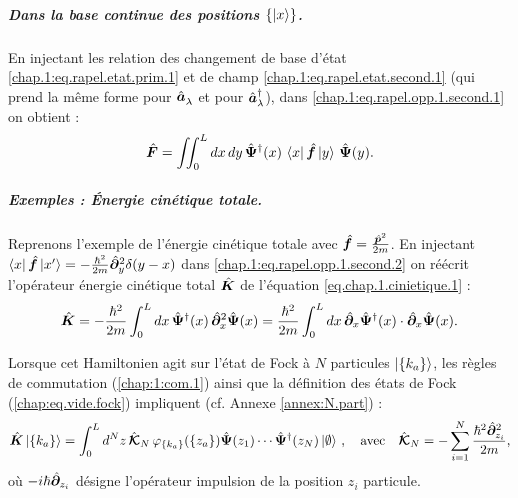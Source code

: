 \subparagraph{Dans la base continue des positions \( \{ \ket{x} \} \).}
En injectant les relation des changement de base d'état
\eqref{chap.1:eq.rapel.etat.prim.1} et de champ \eqref{chap.1:eq.rapel.etat.second.1} (qui prend la même forme pour $\hat{\bm{a}}_\lambda^{}$ et pour $\hat{\bm{a}}_\lambda^\dagger$), dans \eqref{chap.1:eq.rapel.opp.1.second.1} on obtient :
\begin{eqnarray}\label{chap.1:eq.rapel.opp.1.second.2}
\hat{\bm{F}} = \iint_0^L dx \, dy \, \hat{\bm{\Psi}}^\dagger(x) \, \bra{ x} \hat{\bm{f}} \ket{y} \, \hat{\bm{\Psi}}(y).
\end{eqnarray}%
\begin{mdframed}[
	linewidth=0.5pt, 
	backgroundcolor=gray!5, 
	roundcorner=50pt,	
	innerleftmargin=5pt,
    innerrightmargin=5pt,
    innertopmargin=-10pt,
    innerbottommargin=2pt,
    leftmargin=2pt,
    rightmargin=2pt
]
\subparagraph{Exemples : Énergie cinétique totale.}
Reprenons l'exemple de l'énergie cinétique totale avec  $\hat{\bm{f}} = \frac{\hat{\bm{p}}^2}{2m}$. En injectant $\bra{x} \hat{\bm{f}} \ket{x'} = - \frac{\hbar^2}{2m} \hat{\bm{\partial}}_{y}^2 \delta ( y - x )$ dans \eqref{chap.1:eq.rapel.opp.1.second.2} on réécrit l'opérateur énergie cinétique total $\hat{\bm{K}}$ de l'équation \eqref{eq.chap.1.cinietique.1} :
\begin{eqnarray}
\hat{\bm{K}} =  -\frac{\hbar^2}{2m} \int_0^L dx \, \hat{\bm{\Psi}}^\dagger(x) \, \hat{\bm{\partial}}_x^2 \hat{\bm{\Psi}}(x)
= \frac{\hbar^2}{2m} \int_0^L dx \, \hat{\bm{\partial}}_x \hat{\bm{\Psi}}^\dagger(x) \cdot \hat{\bm{\partial}}_x \hat{\bm{\Psi}}(x). \label{eq.chap.1.cinietique.3}
\end{eqnarray}

Lorsque cet Hamiltonien agit sur l’état de Fock à $N$ particules $\ket{\{k_a\}}$, les règles de commutation (\ref{chap:1:com.1}) ainsi que la définition des états de Fock (\ref{chap:eq.vide.fock}) impliquent (cf. Annexe \ref{annex:N.part}) :
\begin{eqnarray}\label{eq.chap.1.cinietique.4}
\hat{\bm{K}}\ket{ \{k_a\}} =  \int_0^L d^N z \, \hat{\bm{\mathcal{K}}}_N \, \varphi_{\{k_a\}}(\{z_a\} ) \hat{\bm{\Psi}}(z_1) \cdots \hat{\bm{\Psi}}^\dag(z_N) \ket{\emptyset}\, , \quad \mbox{avec} \quad \hat{\bm{\mathcal{K}}}_N = -\sum_{i=1}^N \frac{\hbar^2\hat{\bm{\partial}}_{z_i}^2}{2m}, 
\end{eqnarray}
où \( -i \hbar \hat{\bm{\partial}}_{z_i} \) désigne l’opérateur impulsion de la position \( z_i \) particule.
\end{mdframed}

